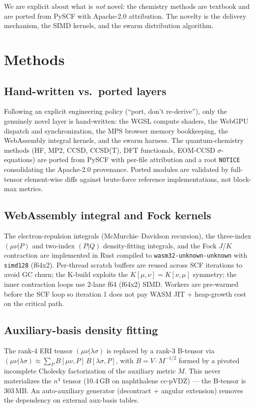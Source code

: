 \documentclass[11pt]{article}
\begin{document}
We are explicit about what is \emph{not} novel: the chemistry methods are
textbook and are ported from PySCF with Apache-2.0 attribution. The novelty is
the delivery mechanism, the SIMD kernels, and the swarm distribution algorithm.

\section{Methods}

\subsection{Hand-written vs.\ ported layers}

Following an explicit engineering policy (``port, don't re-derive''), only the
genuinely novel layer is hand-written: the WGSL compute shaders, the WebGPU
dispatch and synchronization, the MPS browser memory bookkeeping, the
WebAssembly integral kernels, and the swarm harness. The quantum-chemistry
methods (HF, MP2, CCSD, CCSD(T), DFT functionals, EOM-CCSD $\sigma$-equations)
are ported from PySCF with per-file attribution and a root \texttt{NOTICE}
consolidating the Apache-2.0 provenance. Ported modules are validated by
full-tensor element-wise diffs against brute-force reference implementations,
not block-max metrics.

\subsection{WebAssembly integral and Fock kernels}

The electron-repulsion integrals (McMurchie--Davidson recursion), the
three-index $(\mu\nu|P)$ and two-index $(P|Q)$ density-fitting integrals, and
the Fock $J$/$K$ contraction are implemented in Rust compiled to
\texttt{wasm32-unknown-unknown} with \texttt{simd128} (f64x2). Per-thread
scratch buffers are reused across SCF iterations to avoid GC churn; the K-build
exploits the $K[\mu,\nu] = K[\nu,\mu]$ symmetry; the inner contraction loops use
2-lane f64 (f64x2) SIMD. Workers are pre-warmed before the SCF loop so iteration
1 does not pay WASM JIT + heap-growth cost on the critical path.

\subsection{Auxiliary-basis density fitting}

The rank-4 ERI tensor $(\mu\nu|\lambda\sigma)$ is replaced by a rank-3 B-tensor
via $(\mu\nu|\lambda\sigma) \approx \sum_P B[\mu\nu,P]\,B[\lambda\sigma,P]$,
with $B = V\cdot M^{-1/2}$ formed by a pivoted incomplete Cholesky
factorization of the auxiliary metric $M$. This never materializes the $n^4$
tensor (10.4\,GB on naphthalene cc-pVDZ) --- the B-tensor is 303\,MB. An
auto-auxiliary generator (decontract + angular extension) removes the
dependency on external aux-basis tables.
\end{document}
